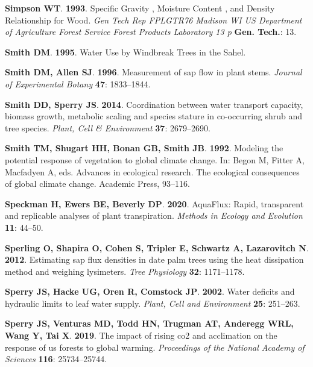 \documentclass[11pt,twoside]{reedthesis}
\begin{document}
\hypertarget{ref-Simpson1993}{}
\textbf{\textnormal{Simpson WT}}. \textbf{1993}. Specific Gravity ,
Moisture Content , and Density Relationship for Wood. \emph{Gen Tech Rep
FPLGTR76 Madison WI US Department of Agriculture Forest Service Forest
Products Laboratory 13 p} \textbf{Gen. Tech.}: 13.

\hypertarget{ref-Smith1995}{}
\textbf{\textnormal{Smith DM}}. \textbf{1995}. Water Use by Windbreak
Trees in the Sahel.

\hypertarget{ref-Smith1996}{}
\textbf{\textnormal{Smith DM}, \textnormal{Allen SJ}}. \textbf{1996}.
Measurement of sap flow in plant stems. \emph{Journal of Experimental
Botany} \textbf{47}: 1833--1844.

\hypertarget{ref-Smith2014}{}
\textbf{\textnormal{Smith DD}, \textnormal{Sperry JS}}. \textbf{2014}.
Coordination between water transport capacity, biomass growth, metabolic
scaling and species stature in co-occurring shrub and tree species.
\emph{Plant, Cell \& Environment} \textbf{37}: 2679--2690.

\hypertarget{ref-Smith1992}{}
\textbf{\textnormal{Smith TM}, \textnormal{Shugart HH},
\textnormal{Bonan GB}, \textnormal{Smith JB}}. \textbf{1992}. Modeling
the potential response of vegetation to global climate change. In: Begon
M, Fitter A, Macfadyen A, eds. Advances in ecological research. The
ecological consequences of global climate change. Academic Press,
93--116.

\hypertarget{ref-Speckman2020}{}
\textbf{\textnormal{Speckman H}, \textnormal{Ewers BE},
\textnormal{Beverly DP}}. \textbf{2020}. AquaFlux: Rapid, transparent
and replicable analyses of plant transpiration. \emph{Methods in Ecology
and Evolution} \textbf{11}: 44--50.

\hypertarget{ref-Sperling2012}{}
\textbf{\textnormal{Sperling O}, \textnormal{Shapira O},
\textnormal{Cohen S}, \textnormal{Tripler E}, \textnormal{Schwartz A},
\textnormal{Lazarovitch N}}. \textbf{2012}. Estimating sap flux
densities in date palm trees using the heat dissipation method and
weighing lysimeters. \emph{Tree Physiology} \textbf{32}: 1171--1178.

\hypertarget{ref-sperry_water_2002}{}
\textbf{\textnormal{Sperry JS}, \textnormal{Hacke UG}, \textnormal{Oren
R}, \textnormal{Comstock JP}}. \textbf{2002}. Water deficits and
hydraulic limits to leaf water supply. \emph{Plant, Cell and
Environment} \textbf{25}: 251--263.

\hypertarget{ref-Sperry2019}{}
\textbf{\textnormal{Sperry JS}, \textnormal{Venturas MD},
\textnormal{Todd HN}, \textnormal{Trugman AT}, \textnormal{Anderegg
WRL}, \textnormal{Wang Y}, \textnormal{Tai X}}. \textbf{2019}. The
impact of rising co2 and acclimation on the response of us forests to
global warming. \emph{Proceedings of the National Academy of Sciences}
\textbf{116}: 25734--25744.
\end{document}
